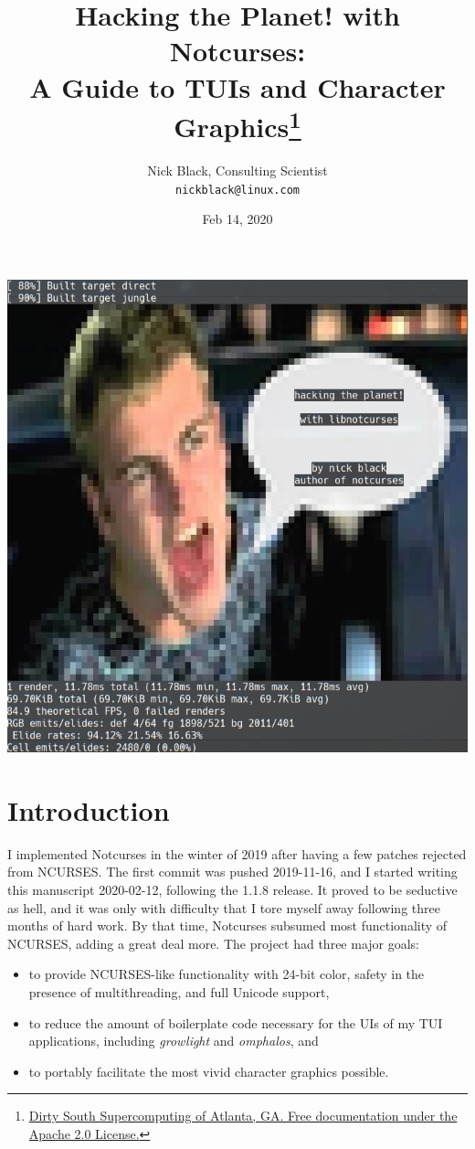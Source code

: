 \documentclass[letterpaper,10pt]{article}
\title{Hacking the Planet! with Notcurses:\\
A Guide to TUIs and Character Graphics\thanks{
 \href{https://www.dsscaw.com/}{Dirty South Supercomputing of Atlanta, GA. Free documentation under the Apache 2.0 License.}
}\\
}
\author{Nick Black, Consulting Scientist\\
\texttt{nickblack@linux.com}
}
\newenvironment{denseitemize}{
  \begin{itemize}
      \setlength{\itemsep}{0pt}
}{
  \end{itemize}
}
\begin{document}
\date{Feb 14, 2020}
\maketitle
\thispagestyle{fancy}
\date{}
\vspace{1in}
\begin{center}
\includegraphics[width=.75\linewidth]{htp-with-notcurses.png}
\end{center}

\clearpage

\tableofcontents

\clearpage

\section{Introduction}

I implemented Notcurses in the winter of 2019 after having a few patches
rejected from NCURSES. The first commit was pushed 2019-11-16, and I started
writing this manuscript 2020-02-12, following the 1.1.8 release. It proved to
be seductive as hell, and it was only with difficulty that I tore myself away
following three months of hard work. By that time, Notcurses subsumed most
functionality of NCURSES, adding a great deal more. The project had three
major goals:

\begin{denseitemize}
\item to provide NCURSES-like functionality with 24-bit color, safety in the
    presence of multithreading, and full Unicode support,
\item to reduce the amount of boilerplate code necessary for the UIs of my
    TUI applications, including \textit{growlight} and \textit{omphalos}, and
\item to portably facilitate the most vivid character graphics possible.
\end{denseitemize}
\end{document}
